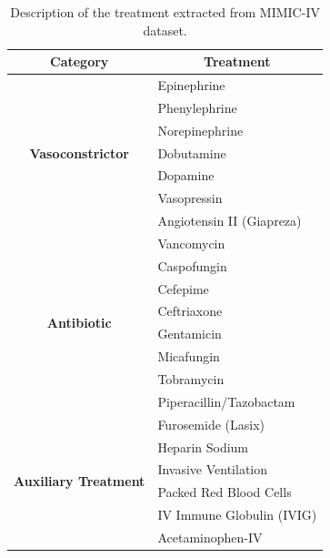 \documentclass{article} %
\begin{document}
\begin{table}[h!]
\centering
\begin{tabular}{c|l}
\hline
\multicolumn{1}{c|}{\textbf{Category}} & \multicolumn{1}{c}{\textbf{Treatment}}  \\
\hline
\multirow{7}{*}{\textbf{Vasoconstrictor}} & Epinephrine \\
\cline{2-2}
~  & Phenylephrine  \\
\cline{2-2}
~  & Norepinephrine \\
\cline{2-2}
~  & Dobutamine  \\
\cline{2-2}
~ & Dopamine  \\
\cline{2-2}
~  & Vasopressin  \\
\cline{2-2}
~  & Angiotensin II (Giapreza)  \\

\hline
\multirow{8}{*}{\textbf{Antibiotic}} & Vancomycin   \\
\cline{2-2}
~ &  Caspofungin  \\
\cline{2-2}
~ & Cefepime   \\
\cline{2-2}
~ & Ceftriaxone   \\
\cline{2-2}
~ & Gentamicin   \\
\cline{2-2}
~ & Micafungin  \\
\cline{2-2}
~ & Tobramycin  \\
\cline{2-2}
~ & Piperacillin/Tazobactam   \\

\hline
\multirow{6}{*}{\textbf{Auxiliary Treatment}} & Furosemide (Lasix)   \\
\cline{2-2}
~ & Heparin Sodium   \\
\cline{2-2}
~ & Invasive Ventilation  \\
\cline{2-2}
~ & Packed Red Blood Cells  \\
\cline{2-2}
~ & IV Immune Globulin (IVIG)  \\
\cline{2-2}
~ &  Acetaminophen-IV  \\

\hline
\end{tabular}
\caption{Description of the treatment extracted from MIMIC-IV dataset.}
\label{appendix:tab_mimic_iv_description}
\end{table}
\end{document}
